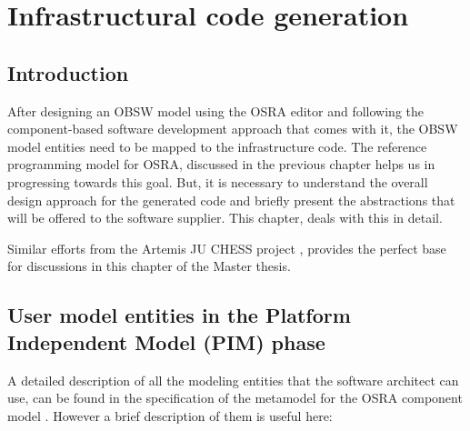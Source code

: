 
\chapter{Infrastructural code generation}
\label{chap: Code generation}
\section{Introduction}
After designing an OBSW model using the OSRA editor and following the component-based software development approach that comes with it, the OBSW model entities need to be mapped to the infrastructure code. The reference programming model for OSRA, discussed in the previous chapter helps us in progressing towards this goal. But, it is necessary to understand the overall design approach for the generated code and briefly present the abstractions that will be offered to the software supplier. This chapter, deals with this in detail.

Similar efforts from the Artemis JU CHESS project \cite{EvoRAVCodeAr}, provides the perfect base for discussions in this chapter of the Master thesis.   

\section{User model entities in the Platform Independent Model (PIM) phase}
A detailed description of all the modeling entities that the software architect can use, can be found in the specification of the metamodel for the OSRA component model \cite{SpecMetamodel}. However a brief description of them is useful here:
 
